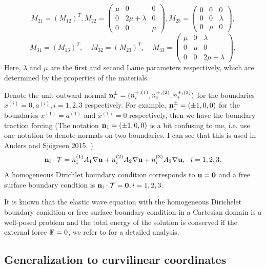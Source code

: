 \documentclass[a4paper]{article}
\begin{document}
\[ M_{21} =(M_{12})^T, M_{22} = \left(\begin{array}{ccc}
\mu & 0 & 0\\
0 & 2\mu+\lambda & 0\\
0 & 0 & \mu\end{array}\right), M_{23} = \left(\begin{array}{ccc}
0 & 0 & 0\\
0 & 0 & \lambda\\
0 & \mu & 0\end{array}\right),\]
\[ M_{31} = (M_{13})^T, \ \ \ \ \ M_{32} =(M_{23})^T, \ \ \ \ \ M_{33} = \left(\begin{array}{ccc}
\mu & 0 & \lambda\\
0 & \mu & 0\\
0 & 0 & 2\mu+\lambda\end{array}\right),\]
Here, $\lambda$ and $\mu$ are the first and second Lame parameters respectively, which are determined by the properties of the materials.

Denote the unit outward normal {\color{blue}${\bf n}_i^{\pm} = (n_i^{\pm,(1)},n_i^{\pm,(2)},n_i^{\pm,(3)})$ for the boundaries $x^{(i)} = 0, a^{(i)}, i = 1,2,3$ respectively. For example, ${\bf n}_1^{\pm} = (\pm 1, 0,0)$ for the boundaries $x^{(1)} = a^{(1)}$ and $x^{(1)} = 0$ respectively}, then we have the boundary traction forcing {\color{red}(The notation ${\bf n}_1 = (\pm 1, 0,0)$ is a bit confusing to me, i.e. use one notation to denote normals on two boundaries. I can see that this is used in Anders and Sjögreen 2015. )}
\begin{equation*}
{\bf n}_i\cdot\mathcal{T} = n^{(1)}_iA_1\nabla{\bf u} + n^{(2)}_iA_2\nabla{\bf u} + n^{(3)}_iA_3\nabla{\bf u},\ \ i = 1,2,3. 
\end{equation*}
A homogeneous Dirichlet boundary condition corresponds to ${\bf u} = {\bf 0}$ and a free surface boundary condtion is ${\bf n}_i\cdot\mathcal{T}  = {\bf 0}, i = 1,2,3$.

It is known that the elastic wave equation with the homogeneous Dirichelet boundary conidtion or free surface boundary condition in a Cartesian domain is a well-posed problem and the total energy of the solution is conserved if the external force ${\bf F} = 0$, we refer to \cite{?} for a detailed analysis.

\subsection{Generalization to curvilinear coordinates}
\end{document}
